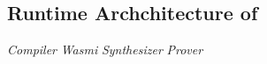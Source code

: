 \subsection{Runtime Archchitecture of \zkwasm}
\noindent\emph{Compiler}
\noindent\emph{Wasmi}
\noindent\emph{Synthesizer}
\noindent\emph{Prover}













